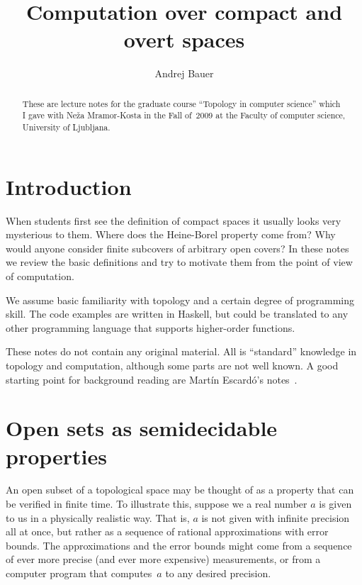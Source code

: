 \documentclass[a4paper,10pt]{article}
\begin{document}
\title{Computation over compact and overt spaces}
\author{Andrej Bauer}

\maketitle

\begin{abstract} These are lecture notes for the graduate course ``Topology in computer science'' which I gave with Neža Mramor-Kosta in the Fall of~2009 at the Faculty of computer science, University of Ljubljana.
\end{abstract}

\section{Introduction}
\label{sec:introduction}

When students first see the definition of compact spaces it usually looks very mysterious to them. Where does the Heine-Borel property come from? Why would anyone consider finite subcovers of arbitrary open covers? In these notes we review the basic definitions and try to motivate them from the point of view of computation.

We assume basic familiarity with topology and a certain degree of programming skill. The code examples are written in Haskell, but could be translated to any other programming language that supports higher-order functions.

These notes do not contain any original material. All is ``standard'' knowledge in topology and computation, although some parts are not well known. A good starting point for background reading are Martín Escardó's notes~\cite{escardo04:_synth}.

\section{Open sets as semidecidable properties}
\label{sec:opens-semidecidable}

An open subset of a topological space may be thought of as a property that can be verified in finite time. To illustrate this, suppose we a real number $a$ is given to us in a physically realistic way. That is, $a$ is not given with infinite precision all at once, but rather as a sequence of rational approximations with error bounds. The approximations and the error bounds might come from a sequence of ever more precise (and ever more expensive) measurements, or from a computer program that computes~$a$ to any desired precision.
\end{document}
